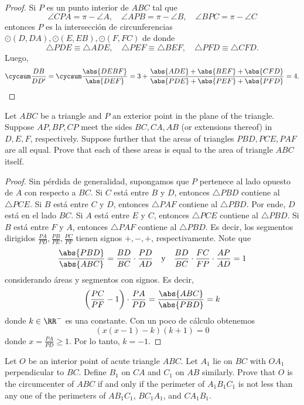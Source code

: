 \begin{proof}
	Si $P$ es un punto interior de $ABC$ tal que
	\[\angle CPA=\pi-\angle A,\quad\angle APB=\pi-\angle B,\quad\angle BPC=\pi-\angle C\]
	entonces $P$ es la intersección de circunferencias $\odot(D,DA),\odot(E,EB),\odot(F,FC)$ de donde
	\[\triangle PDE\equiv\triangle ADE,\quad\triangle PEF\equiv\triangle BEF,\quad\triangle PFD\equiv\triangle CFD.\]
	Luego,
	\[\cycsum\frac{DB}{DD'}=\cycsum\frac{\abs{DEBF}}{\abs{DEF}}=3+\frac{\abs{ADE}+\abs{BEF}+\abs{CFD}}{\abs{PDE}+\abs{PEF}+\abs{PFD}}=4.\]
\end{proof}

\begin{probEG}[ISL 2001/G6]
	Let $ABC$ be a triangle and $P$ an exterior point in the plane of the triangle. Suppose $AP,BP,CP$ meet the sides $BC,CA,AB$ (or extensions thereof) in $D,E,F$, respectively. Suppose further that the areas of triangles $PBD,PCE,PAF$ are all equal. Prove that each of these areas is equal to the area of triangle $ABC$ itself.
\end{probEG}

\begin{proof}
	Sin pérdida de generalidad, supongamos que $P$ pertenece al lado opuesto de $A$ con respecto a $BC$. Si $C$ está entre $B$ y $D$, entonces $\triangle PBD$ contiene al $\triangle PCE$. Si $B$ está entre $C$ y $D$, entonces $\triangle PAF$ contiene al $\triangle PBD$. Por ende, $D$ está en el lado $BC$. Si $A$ está entre $E$ y $C$, entonces $\triangle PCE$ contiene al $\triangle PBD$. Si $B$ está entre $F$ y $A$, entonces $\triangle PAF$ contiene al $\triangle PBD$. Es decir, los segmentos dirigidos $\frac{PA}{PD},\frac{PB}{PE},\frac{PC}{PF}$ tienen signos $+,-,+$, respectivamente. Note que
	\[\frac{\abs{PBD}}{\abs{ABC}}=\frac{BD}{BC}\cdot\frac{PD}{AD}\quad\text{y}\quad\frac{BD}{BC}\cdot\frac{FC}{FP}\cdot\frac{AP}{AD}=1\]
	considerando áreas y segmentos con signos. Es decir,
	\[\left(\frac{PC}{PF}-1\right)\cdot\frac{PA}{PD}=\frac{\abs{ABC}}{\abs{PBD}}=k\]
	donde $k\in\RR^-$ es una constante. Con un poco de cálculo obtenemos
	\[(x(x-1)-k)(k+1)=0\]
	donde $x=\frac{PA}{PD}\ge 1$. Por lo tanto, $k=-1$.
\end{proof}

\begin{probEG}[ISL 2001/G7]
	Let $O$ be an interior point of acute triangle $ABC$. Let $A_1$ lie on $BC$ with $OA_1$ perpendicular to $BC$. Define $B_1$ on $CA$ and $C_1$ on $AB$ similarly. Prove that $O$ is the circumcenter of $ABC$ if and only if the perimeter of $A_1B_1C_1$ is not less than any one of the perimeters of $AB_1C_1$, $BC_1A_1$, and $CA_1B_1$.
\end{probEG}

